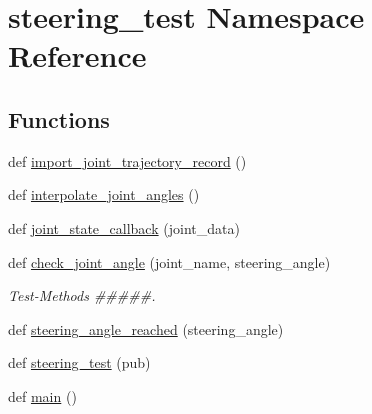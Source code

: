 \hypertarget{namespacesteering__test}{}\section{steering\+\_\+test Namespace Reference}
\label{namespacesteering__test}
\subsection*{Functions}
\begin{DoxyCompactItemize}
\item 
def \mbox{\hyperlink{namespacesteering__test_adb16a753c42a4209aa14b4d11d2225db}{import\+\_\+joint\+\_\+trajectory\+\_\+record}} ()
\item 
def \mbox{\hyperlink{namespacesteering__test_a52bb2edb02011a6aea92fcea110f4f72}{interpolate\+\_\+joint\+\_\+angles}} ()
\item 
def \mbox{\hyperlink{namespacesteering__test_a4bbdc0d5176cbe3c052f56a40f6ca888}{joint\+\_\+state\+\_\+callback}} (joint\+\_\+data)
\item 
def \mbox{\hyperlink{namespacesteering__test_ac212ddb8df1b385c31ae7edabcc19e02}{check\+\_\+joint\+\_\+angle}} (joint\+\_\+name, steering\+\_\+angle)
\begin{DoxyCompactList}\small\item\em Test-\/\+Methods \#\#\#\#\#. \end{DoxyCompactList}\item 
def \mbox{\hyperlink{namespacesteering__test_ac7c6bd40ee987a9480e691e05324fee7}{steering\+\_\+angle\+\_\+reached}} (steering\+\_\+angle)
\item 
def \mbox{\hyperlink{namespacesteering__test_a3c6b6ed0ed832ad5e4fd2cd28c36e0e5}{steering\+\_\+test}} (pub)
\item 
def \mbox{\hyperlink{namespacesteering__test_a9d5fe21e82ec8c7642ba6b3c9bb8919e}{main}} ()
\end{DoxyCompactItemize}
